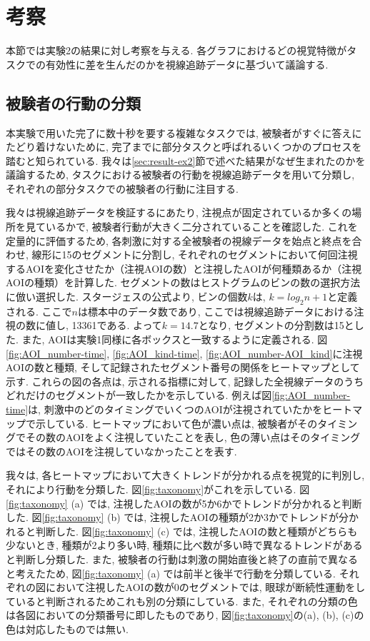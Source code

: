 \documentclass{kuee}
\begin{document}
\section{考察}
本節では実験2の結果に対し考察を与える.
各グラフにおけるどの視覚特徴がタスクでの有効性に差を生んだのかを視線追跡データに基づいて議論する.

\subsection{被験者の行動の分類}
\label{subsec:subtask}
本実験で用いた完了に数十秒を要する複雑なタスクでは, 被験者がすぐに答えにたどり着けないために, 完了までに部分タスクと呼ばれるいくつかのプロセスを踏むと知られている.
我々は\ref{sec:result-ex2}節で述べた結果がなぜ生まれたのかを議論するため, タスクにおける被験者の行動を視線追跡データを用いて分類し, それぞれの部分タスクでの被験者の行動に注目する.

我々は視線追跡データを検証するにあたり, 注視点が固定されているか多くの場所を見ているかで, 被験者行動が大きく二分されていることを確認した.
これを定量的に評価するため, 各刺激に対する全被験者の視線データを始点と終点を合わせ, 線形に15のセグメントに分割し, それぞれのセグメントにおいて何回注視するAOIを変化させたか（注視AOIの数）と注視したAOIが何種類あるか（注視AOIの種類）を計算した.
セグメントの数はヒストグラムのビンの数の選択方法に倣い選択した.
スタージェスの公式より, ビンの個数$k$は, $k = log_2 n + 1$と定義される.
ここで$n$は標本中のデータ数であり, ここでは視線追跡データにおける注視の数に値し, 13361である.
よって$k = 14.7$となり, セグメントの分割数は15とした.
また, AOIは実験1同様に各ボックスと一致するように定義される.
図\ref{fig:AOI_number-time}, \ref{fig:AOI_kind-time}, \ref{fig:AOI_number-AOI_kind}に注視AOIの数と種類, そして記録されたセグメント番号の関係をヒートマップとして示す.
これらの図の各点は, 示される指標に対して, 記録した全視線データのうちどれだけのセグメントが一致したかを示している.
例えば図\ref{fig:AOI_number-time}は, 刺激中のどのタイミングでいくつのAOIが注視されていたかをヒートマップで示している.
ヒートマップにおいて色が濃い点は, 被験者がそのタイミングでその数のAOIをよく注視していたことを表し, 色の薄い点はそのタイミングではその数のAOIを注視していなかったことを表す.

我々は, 各ヒートマップにおいて大きくトレンドが分かれる点を視覚的に判別し, それにより行動を分類した.
図\ref{fig:taxonomy}がこれを示している.
図\ref{fig:taxonomy} (a) では, 注視したAOIの数が5か6かでトレンドが分かれると判断した.
図\ref{fig:taxonomy} (b) では, 注視したAOIの種類が2か3かでトレンドが分かれると判断した.
図\ref{fig:taxonomy} (c) では, 注視したAOIの数と種類がどちらも少ないとき, 種類が2より多い時,  種類に比べ数が多い時で異なるトレンドがあると判断し分類した.
また, 被験者の行動は刺激の開始直後と終了の直前で異なると考えたため, 図\ref{fig:taxonomy} (a) では前半と後半で行動を分類している.
それぞれの図において注視したAOIの数が0のセグメントでは, 眼球が断続性運動をしていると判断されるためこれも別の分類にしている.
また, それぞれの分類の色は各図においての分類番号に即したものであり, 図\ref{fig:taxonomy}の(a), (b), (c)の色は対応したものでは無い.
\end{document}
